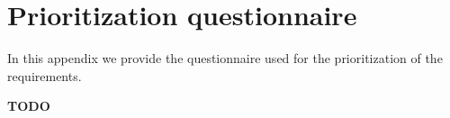 
\chapter{\label{cha:glossary}Prioritization questionnaire}

In this appendix we provide the questionnaire used for the prioritization of the requirements.


\textbf{TODO}

